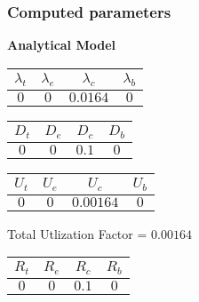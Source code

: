 \documentclass{article}
\begin{document}
\subsubsection{Computed parameters}
\begin{minipage}{0.5\textwidth}
\centering	\textbf{Analytical Model}
\begin{table}[H]
\centering
\begin{tabular}{@{}cccc@{}}
\toprule
$\lambda_t$ & $\lambda_e$ & $\lambda_c$ & $\lambda_b$\\
\midrule
$0$ & $0$ & $0.0164$ & $0$\\
\bottomrule
\end{tabular}
\end{table}\begin{table}[H]
\centering
\begin{tabular}{@{}cccc@{}}
\toprule
$D_t$ & $D_e$ & $D_c$ & $D_b$\\
\midrule
$0$ & $0$ & $0.1$ & $0$\\
\bottomrule
\end{tabular}
\end{table}\begin{table}[H]
\centering
\begin{tabular}{@{}cccc@{}}
\toprule
$U_t$ & $U_e$ & $U_c$ & $U_b$\\
\midrule
$0$ & $0$ & $0.00164$ & $0$\\
\bottomrule
\end{tabular}
\end{table}
\centering Total Utlization Factor = $0.00164$
\begin{table}[H]
\centering
\begin{tabular}{@{}cccc@{}}
\toprule
$R_t$ & $R_e$ & $R_c$ & $R_b$\\
\midrule
$0$ & $0$ & $0.1$ & $0$\\
\bottomrule
\end{tabular}
\end{table}
\end{minipage}
\end{document}
